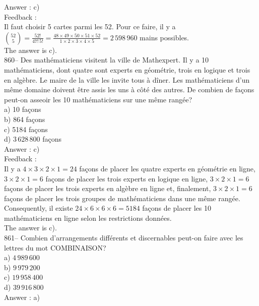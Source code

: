 ﻿\documentclass[letterpaper, 12pt]{article}
\begin{document}
Answer : c)\\

Feedback : \\
Il faut choisir 5 cartes parmi les 52.  Pour ce faire, il y a
$\binom{52}{5}=\frac{52!}{47!\,5!}=\frac{48\times49\times50\times51\times52}{1\times2\times3\times4\times5}=2\,598\,960$
mains possibles.\\
The answer is c).\\

860--  Des math\'ematiciens visitent la ville de Mathexpert.  Il y a 10
math\'ematiciens, dont quatre sont experts en g\'eom\'etrie, trois en
logique et trois en alg\`ebre.  Le maire de la ville les invite tous \`a
d\^iner.  Les math\'ematiciens d'un m\^eme domaine doivent \^etre assis les
uns \`a c\^ot\'e des autres.  De combien de fa\c cons peut-on asseoir les 10
math\'ematiciens sur une m\^eme rang\'ee?\\
a) 10  fa\c cons\\
b) 864  fa\c cons\\
c) 5184  fa\c cons\\
d) $3\,628\,800$  fa\c cons\\

Answer : c)\\

Feedback : \\
Il y a $4\times3\times2\times1=24$ fa\c cons de placer les quatre
experts en g\'eom\'etrie en ligne, $3\times2\times1=6$ fa\c cons de
placer les trois experts en logique en ligne, $3\times2\times1=6$
fa\c cons
de placer les trois experts en alg\`ebre en ligne et, finalement,
$3\times2\times1=6$ fa\c cons de placer les trois groupes de
math\'ematiciens dans une m\^eme rang\'ee.  \\
Consequently, il existe $24\times6\times6\times6=5184$ fa\c cons de
placer les 10 math\'ematiciens en ligne selon les restrictions donn\'ees.
\\
The answer is c).\\

861-- Combien d'arrangements diff\'erents et discernables peut-on faire avec
les lettres du mot \sloppy \mbox{COMBINAISON?}\\
a) $4\,989\,600$\\
b) $9\,979\,200$\\
c) $19\,958\,400$\\
d) $39\,916\,800$\\

Answer : a)\\
\end{document}

